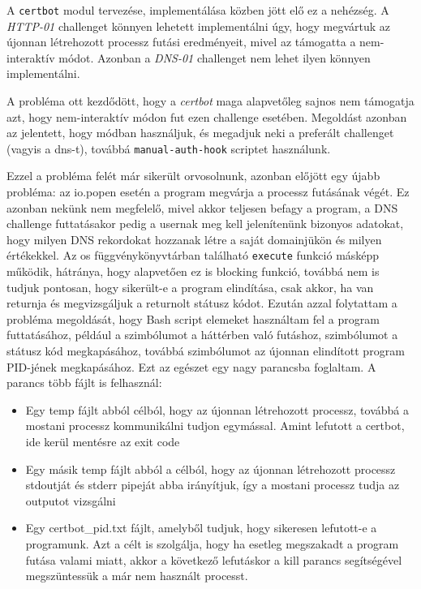 A \texttt{certbot} modul tervezése, implementálása közben jött elő ez a nehézség. A \textit{HTTP-01} challenget könnyen lehetett implementálni úgy, hogy megvártuk az újonnan létrehozott processz futási eredményeit, mivel az támogatta a nem-interaktív módot. Azonban a \textit{DNS-01} challenget nem lehet ilyen könnyen implementálni.

A probléma ott kezdődött, hogy a \textit{certbot} maga alapvetőleg sajnos nem támogatja azt, hogy nem-interaktív módon fut ezen challenge esetében. Megoldást azonban az jelentett, hogy \texttt{} módban használjuk, és megadjuk neki a preferált challenget (vagyis a dns-t), továbbá \texttt{manual-auth-hook} scriptet használunk. 


Ezzel a probléma felét már sikerült orvosolnunk, azonban előjött egy újabb probléma: az io.popen esetén a program megvárja a processz futásának végét. Ez azonban nekünk nem megfelelő, mivel akkor teljesen befagy a program, a DNS challenge futtatásakor pedig a usernak meg kell jelenítenünk bizonyos adatokat, hogy milyen DNS rekordokat hozzanak létre a saját domainjükön és milyen értékekkel. Az os függvénykönyvtárban található \texttt{execute} funkció másképp működik, hátránya, hogy alapvetően ez is blocking funkció, továbbá nem is tudjuk pontosan, hogy sikerült-e a program elindítása, csak akkor, ha van returnja és megvizsgáljuk a returnolt státusz kódot.
Ezután azzal folytattam a probléma megoldását, hogy Bash script elemeket használtam fel a program futtatásához, például a \texttt{\detokenize{&}} szimbólumot a háttérben való futáshoz, \texttt{} szimbólumot a státusz kód megkapásához, továbbá \texttt{\detokenize{$!}} szimbólumot az újonnan elindított program PID-jének megkapásához. Ezt az egészet egy nagy parancsba foglaltam. A parancs több fájlt is felhasznál:
\begin{itemize}
	\item Egy temp fájlt abból célból, hogy az újonnan létrehozott processz, továbbá a mostani processz kommunikálni tudjon egymással. Amint lefutott a certbot, ide kerül mentésre az exit code
	\item Egy másik temp fájlt abból a célból, hogy az újonnan létrehozott processz stdoutját és stderr pipeját abba irányítjuk, így a mostani processz tudja az outputot vizsgálni
	\item Egy certbot\_pid.txt fájlt, amelyből tudjuk, hogy sikeresen lefutott-e a programunk. Azt a célt is szolgálja, hogy ha esetleg megszakadt a program futása valami miatt, akkor a következő lefutáskor a kill parancs segítségével megszüntessük a már nem használt processt.
\end{itemize}

